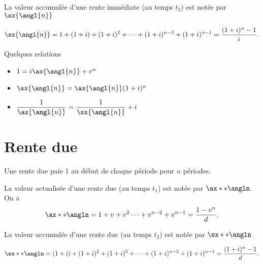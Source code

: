 La valeur accumulée d'une rente immédiate (au temps \textcolor{dlblue}{$t_2$}) est notée par $\sx{\angl{n}}$

$$\sx{\angl{n}} = 1 + (1+i) + (1+i)^2+ \dots + (1 + i)^{n-2} + (1+i)^{n-1} = \frac{(1+i)^n - 1}{i}.$$

Quelques relations 
\begin{multicols}{3}
	\begin{itemize}
		\item $1 = i\ax{\angl{n}} + v^n$
		\item $\sx{\angl{n}} = \ax{\angl{n}} (1+i)^n$
		\item $\displaystyle \frac{1}{\ax{\angl{n}}} = \frac{1}{\sx{\angl{n}}} + i$
	\end{itemize}
\end{multicols}

\section{Rente due}

Une rente due paie 1 au début de chaque période pour $n$ périodes. 

\begin{center}
\end{center}

La valeur actualisée d'une rente due (au temps \textcolor{dlblue}{$t_1$}) est notée par $\ax**{\angln}$. On a 
$$\ax**{\angln} = 1 + v + v^2 \dots + v^{n-2} + v^{n-1} = \frac{1 - v^n}{d}.$$

La valeur accumulée d'une rente due (au temps \textcolor{dlblue}{$t_2$}) est notée par $\sx**{\angln}$

$$\sx**{\angln} = (1+i) + (1+i)^2 + (1+i)^3 + \dots + (1+i)^{n-2} + (1+i)^{n-1} = \frac{(1+i)^n - 1}{d}.$$

